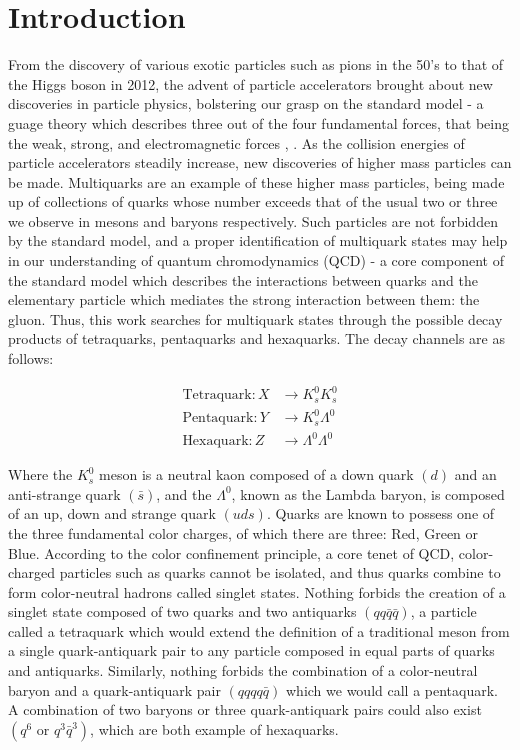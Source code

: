 \documentclass{article}
\begin{document}
\section{Introduction}
From the discovery of various exotic particles such as pions in the 50's to that of the Higgs
boson in 2012, the advent of particle accelerators brought about new discoveries in particle physics,
bolstering our grasp on the standard model - a guage theory which describes three out of the four
fundamental forces, that being the weak, strong, and electromagnetic forces \cite{KLDiscovery}, \cite{HiggsDiscovery}. 
As the collision energies of particle accelerators steadily increase, new discoveries of higher mass particles 
can be made. 
Multiquarks are an example of these higher mass particles, being made up of collections of quarks
whose number exceeds that of the usual two or three we observe in mesons and baryons respectively.
Such particles are not forbidden by the standard model, and a proper identification of multiquark 
states may help in our understanding of quantum chromodynamics (QCD) - a core component of the standard 
model which describes the interactions between quarks and the elementary particle which mediates 
the strong interaction between them: the gluon. Thus, this work searches for multiquark states 
through the possible decay products of tetraquarks, pentaquarks and hexaquarks. The decay channels
are as follows:

\begin{align*}
\text{Tetraquark}: X &\rightarrow K^0_sK^0_s \\
\text{Pentaquark}: Y &\rightarrow K^0_s\Lambda^0 \\
\text{Hexaquark}:  Z &\rightarrow \Lambda^0\Lambda^0
\end{align*}

Where the $K^0_s$ meson is a neutral kaon composed of a down quark $(d)$ and an anti-strange quark 
$(\bar{s})$, and the $\Lambda^0$, known as the Lambda baryon, is composed of an up, down and strange 
quark $(uds)$. Quarks are known to possess one of the three fundamental color charges, of which there 
are three: Red, Green or Blue. According to the color confinement principle, a core tenet of QCD,
color-charged particles such as quarks cannot be isolated, and thus quarks combine to form color-neutral 
hadrons called singlet states. Nothing forbids the creation of a singlet state composed of two 
quarks and two antiquarks $(qq\bar{q}\bar{q})$, a particle called a tetraquark which would extend 
the definition of a traditional meson from a single quark-antiquark pair to any particle composed 
in equal parts of quarks and antiquarks. Similarly, nothing forbids the combination of a color-neutral 
baryon and a quark-antiquark pair $(qqqq\bar{q})$ which we would call a pentaquark. A combination of 
two baryons or three quark-antiquark pairs could also exist $(q^6 \text{ or } q^3\bar{q}^{3})$, 
which are both example of hexaquarks.
\end{document}
